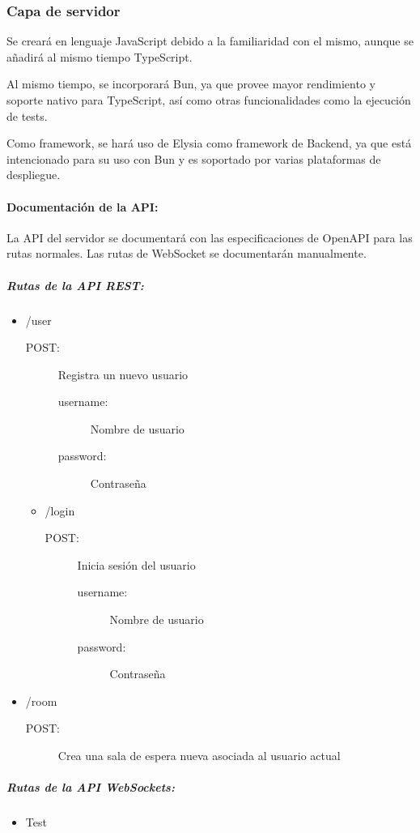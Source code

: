 \subsubsection{Capa de servidor}
Se creará en lenguaje JavaScript debido a la familiaridad con el mismo, aunque se añadirá al mismo tiempo TypeScript. 

Al mismo tiempo, se incorporará Bun,
ya que provee mayor rendimiento y soporte nativo para TypeScript,
así como otras funcionalidades como la ejecución de tests. 

Como framework, se hará uso de Elysia como framework de Backend, ya que está intencionado para su uso con Bun
y es soportado por varias plataformas de despliegue. 

\paragraph{Documentación de la API:}

La API del servidor se documentará con las especificaciones de OpenAPI para las rutas normales.
Las rutas de WebSocket se documentarán manualmente.

\subparagraph{Rutas de la API REST:}

\begin{itemize}
  \item /user
    \begin{description}
      \item[POST:] Registra un nuevo usuario
        \begin{description}
          \item[username:] Nombre de usuario
          \item[password:] Contraseña
        \end{description}
    \end{description}
    \begin{itemize}
      \item /login
        \begin{description}
          \item[POST:] Inicia sesión del usuario
            \begin{description}
              \item[username:] Nombre de usuario
              \item[password:] Contraseña
            \end{description}
        \end{description}
    \end{itemize}
  \item /room
      \begin{description}
      \item[POST:] Crea una sala de espera nueva asociada al usuario actual
      \end{description}
\end{itemize}
\subparagraph{Rutas de la API WebSockets:}
\begin{itemize}
  \item Test
\end{itemize}

